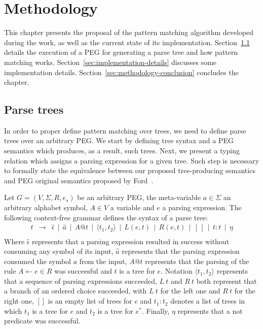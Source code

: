 \chapter{Methodology}\label{chap:methodology}

This chapter presents the proposal of the pattern matching algorithm developed
during the work, as well as the  current state of its implementation.
Section~\ref{sec:parse-tress} details
the execution of a PEG for generating a parse tree and how pattern matching works.
Section~\ref{sec:implementation-details} discusses some implementation details.
Section~\ref{sec:methodology-conclusion} concludes the chapter.

\section{Parse trees}\label{sec:parse-tress}

In order to proper define pattern matching over trees, we need
to define parse trees over an arbitrary PEG. We start by defining
tree syntax and a PEG semantics which produces, as a result, such
trees. Next, we present a typing relation which assigns a parsing
expression for a given tree. Such step is necessary to formally
state the equivalence between our proposed tree-producing semantics
and PEG original semantics proposed by Ford~\cite{Ford04}.

Let \(G = (V, \Sigma, R, e_s)\) be an arbitrary PEG, the meta-variable \(a \in \Sigma\) an
arbitrary alphabet symbol, \(A \in V\) a variable and \(e\) a parsing expression.
The following context-free grammar defines the syntax of a parse tree:
\[
   \begin{array}{lcl}
      t & \to & \hat{\epsilon} \, \mid \, \hat{a} \, \mid \, A@t\,
                    \mid \, \langle t_1, t_2 \rangle\,
                    \mid \, L(e,t) \, \mid \, R(e,t) \, \mid \, [\,] \,\mid\,t:t\,
                    \mid \, \eta \\
   \end{array}
\]
Where \(\hat{\epsilon}\) represents that a parsing expression resulted in
success without consuming any symbol of its input, \(\hat{a}\) represents that
the parsing expression consumed the symbol \(a\) from the input, \(A@t\)
represents that the parsing of the rule \(A \leftarrow e \in R\) was succeesful
and $t$ is a tree for $e$. Notation
\(\langle t_1, t_2 \rangle\) represents that a sequence of parsing expressions
succeeded,
\(L \: t\) and \(R \: t\) both represent that a branch of an ordered choice succeeded,
with \(L \: t\) for the left one and \(R \: t\) for the right one,
\([]\) is an empty list of trees for $e$ and \(t_1 : t_2\) denotes a list of
trees in which $t_1$ is a tree for $e$ and $t_2$ is a tree for $e^*$. Finally,
\(\eta\) represents that a not
predicate was successful.

